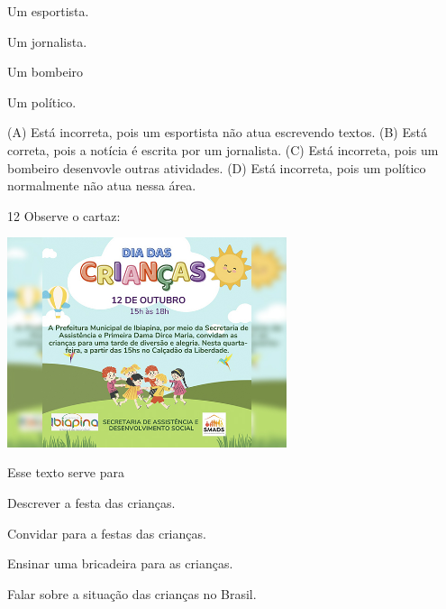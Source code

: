 \begin{minipage}{.5\textwidth}
\begin{escolha}
\item Um esportista.

\item Um jornalista.

\item Um bombeiro

\item Um político.
\end{escolha}
\end{minipage}

(A) Está incorreta, pois um esportista não atua escrevendo textos.
(B) Está correta, pois a notícia é escrita por um jornalista.
(C) Está incorreta, pois um bombeiro desenvovle outras atividades.
(D) Está incorreta, pois um político normalmente não atua nessa área.

\num{12} Observe o cartaz:

\includegraphics[width=3.22436in,height=2.42060in]{media/image181.jpeg}


Esse texto serve para

\begin{escolha}
\item Descrever a festa das crianças.

\item Convidar para a festas das crianças.

\item Ensinar uma bricadeira para as crianças.

\item Falar sobre a situação das crianças no Brasil.
\end{escolha}

